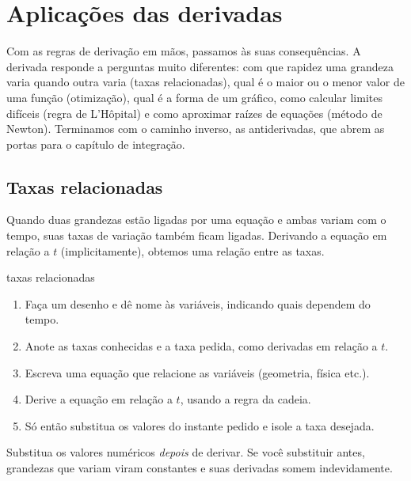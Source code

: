 \chapter{Aplicações das derivadas}

Com as regras de derivação em mãos, passamos às suas consequências. A derivada responde a
perguntas muito diferentes: com que rapidez uma grandeza varia quando outra varia (taxas
relacionadas), qual é o maior ou o menor valor de uma função (otimização), qual é a forma de
um gráfico, como calcular limites difíceis (regra de L'Hôpital) e como aproximar raízes de
equações (método de Newton). Terminamos com o caminho inverso, as antiderivadas, que abrem
as portas para o capítulo de integração.

\section{Taxas relacionadas}

Quando duas grandezas estão ligadas por uma equação e ambas variam com o tempo, suas taxas
de variação também ficam ligadas. Derivando a equação em relação a $t$ (implicitamente),
obtemos uma relação entre as taxas.

\begin{estrategia}{taxas relacionadas}
\begin{enumerate}[label=\arabic*.]
\item Faça um desenho e dê nome às variáveis, indicando quais dependem do tempo.
\item Anote as taxas conhecidas e a taxa pedida, como derivadas em relação a $t$.
\item Escreva uma equação que relacione as variáveis (geometria, física etc.).
\item Derive a equação em relação a $t$, usando a regra da cadeia.
\item Só então substitua os valores do instante pedido e isole a taxa desejada.
\end{enumerate}
\end{estrategia}

\begin{nota}
Substitua os valores numéricos \emph{depois} de derivar. Se você substituir antes,
grandezas que variam viram constantes e suas derivadas somem indevidamente.
\end{nota}

